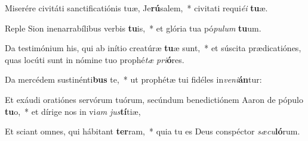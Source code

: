 \item Miserére civitáti sanctificatiónis tuæ, Je\textbf{rú}salem,~* civitati requi\textit{é}\textit{i} \textbf{tu}æ.
\item Reple Sion inenarrabílibus verbis \textbf{tu}is,~* et glória tua pó\textit{pu}\textit{lum} \textbf{tu}um.
\item Da testimónium his, qui ab inítio creatúræ \textbf{tu}æ sunt,~* et súscita prædicatiónes, quas locúti sunt in nómine tuo prophé\textit{tæ} \textit{pri}\textbf{ó}res.
\item Da mercédem sustinénti\textbf{bus} te,~* ut prophétæ tui fidéles in\textit{ve}\textit{ni}\textbf{án}tur:
\item Et exáudi oratiónes servórum tuórum, secúndum benedictiónem Aaron de pópulo \textbf{tu}o,~* et dírige nos in vi\textit{am} \textit{jus}\textbf{tí}tiæ,
\item Et sciant omnes, qui hábitant \textbf{ter}ram,~* quia tu es Deus conspéctor \textit{sæ}\textit{cu}\textbf{ló}rum.

